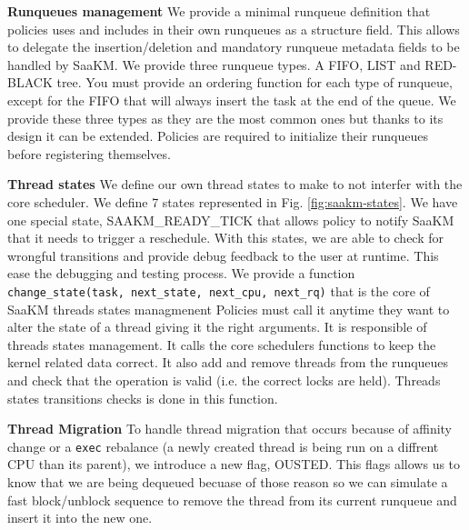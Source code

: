 \par \textbf{Runqueues management} We provide a minimal runqueue definition that policies uses and includes in their own runqueues as a structure field. This allows to delegate the insertion/deletion and mandatory runqueue metadata fields to be handled by SaaKM. We provide three runqueue types. A FIFO, LIST and RED-BLACK tree. You must provide an ordering function for each type of runqueue, except for the FIFO that will always insert the task at the end of the queue. We provide these three types as they are the most common ones but thanks to its design it can be extended. Policies are required to initialize their runqueues before registering themselves.\newline 

\par \textbf{Thread states} We define our own thread states to make to not interfer with the core scheduler. We define 7 states represented in Fig. \ref{fig:saakm-states}. We have one special state, SAAKM\_READY\_TICK that allows policy to notify SaaKM that it needs to trigger a reschedule. With this states, we are able to check for wrongful transitions and provide debug feedback to the user at runtime. This ease the debugging and testing process. We provide a function \texttt{change\_state(task, next\_state, next\_cpu, next\_rq)} that is the core of SaaKM threads states managmenent Policies must call it anytime they want to alter the state of a thread giving it the right arguments. It is responsible of threads states management. It calls the core schedulers functions to keep the kernel related data correct. It also add and remove threads from the runqueues and check that the operation is valid (i.e. the correct locks are held). Threads states transitions checks is done in this function.
\newline

\par \textbf{Thread Migration} To handle thread migration that occurs because of affinity change or a \texttt{exec} rebalance (a newly created thread is being run on a diffrent CPU than its parent), we introduce a new flag, OUSTED. This flags allows us to know that we are being dequeued becuase of those reason so we can simulate a fast block/unblock sequence to remove the thread from its current runqueue and insert it into the new one. \newline

